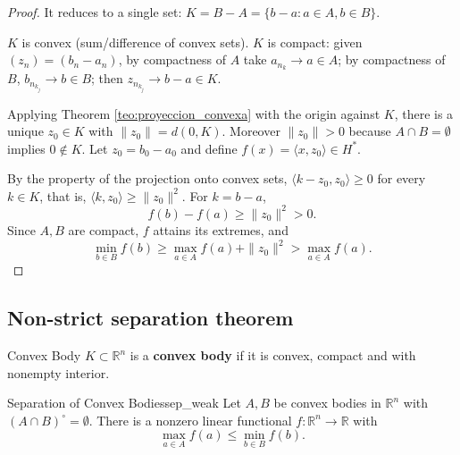 \documentclass[11pt, a4paper]{article}
\begin{document}
\begin{proof}
It reduces to a single set: $K = B - A = \{b - a : a \in A, b \in B\}$.

$K$ is convex (sum/difference of convex sets). $K$ is compact: given $(z_n) = (b_n - a_n)$, by compactness
of $A$ take $a_{n_k} \to a \in A$; by compactness of $B$, $b_{n_{k_j}} \to b \in B$; then
$z_{n_{k_j}} \to b - a \in K$.

Applying Theorem \ref{teo:proyeccion_convexa} with the origin against $K$, there is a unique $z_0 \in K$ with
$\|z_0\| = d(0, K)$. Moreover $\|z_0\| > 0$ because $A \cap B = \emptyset$ implies $0 \notin K$. Let
$z_0 = b_0 - a_0$ and define $f(x) = \langle x, z_0 \rangle \in H^*$.

By the property of the projection onto convex sets, $\langle k - z_0, z_0 \rangle \ge 0$ for every
$k \in K$, that is, $\langle k, z_0 \rangle \ge \|z_0\|^2$. For $k = b - a$,
$$ f(b) - f(a) \ge \|z_0\|^2 > 0. $$
Since $A, B$ are compact, $f$ attains its extremes, and
$$ \min_{b \in B} f(b) \ge \max_{a \in A} f(a) + \|z_0\|^2 > \max_{a \in A} f(a). $$
\end{proof}

\subsection{Non-strict separation theorem}

\begin{definicion}{Convex Body}{}
$K \subset \mathbb{R}^n$ is a \textbf{convex body} if it is convex, compact and with nonempty
interior.
\end{definicion}

\begin{teorema}{Separation of Convex Bodies}{sep_weak}
Let $A, B$ be convex bodies in $\mathbb{R}^n$ with $(A \cap B)^\circ = \emptyset$. There is a
nonzero linear functional $f: \mathbb{R}^n \to \mathbb{R}$ with
$$ \max_{a \in A} f(a) \le \min_{b \in B} f(b). $$
\end{teorema}
\end{document}
